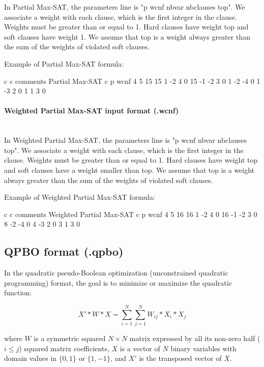 \documentclass{article}
\begin{document}
In Partial Max-SAT, the parameters line is "p wcnf nbvar nbclauses top". We associate a weight with each clause, which is the first integer in the clause. Weights must be greater than or equal to 1. Hard clauses have weight top and soft clauses have weight 1. We assume that top is a weight always greater than the sum of the weights of violated soft clauses.

Example of Partial Max-SAT formula:

\begin{DoxyCode}
c
c comments Partial Max-SAT
c
p wcnf 4 5 15
15 1 -2 4 0
15 -1 -2 3 0
1 -2 -4 0
1 -3 2 0
1 1 3 0
\end{DoxyCode}

\paragraph{Weighted Partial Max-SAT input format (.wcnf)}~\\

In Weighted Partial Max-SAT, the parameters line is "p wcnf nbvar nbclauses top". We associate a weight with each clause, which is the first integer in the clause. Weights must be greater than or equal to 1. Hard clauses have weight top and soft clauses have a weight smaller than top. We assume that top is a weight always greater than the sum of the weights of violated soft clauses.

Example of Weighted Partial Max-SAT formula:

\begin{DoxyCode}
c
c comments Weighted Partial Max-SAT
c
p wcnf 4 5 16
16 1 -2 4 0
16 -1 -2 3 0
8 -2 -4 0
4 -3 2 0
3 1 3 0
\end{DoxyCode}

\subsection{QPBO format (.qpbo)}

In the quadratic pseudo-Boolean optimization (unconstrained quadratic programming) format,
the goal is to minimize or maximize the quadratic function:

$$X' * W * X = \sum_{i=1}^N \sum_{j=1}^N  W_{ij} * X_i * X_j$$

where $W$ is a symmetric squared $N \times N$ matrix expressed by all its non-zero half ($i \leq j$) squared matrix coefficients, $X$ is a vector of $N$ binary variables with domain values in $\{0,1\}$ or $\{1,-1\}$, and $X'$ is the transposed vector of $X$.
\end{document}
